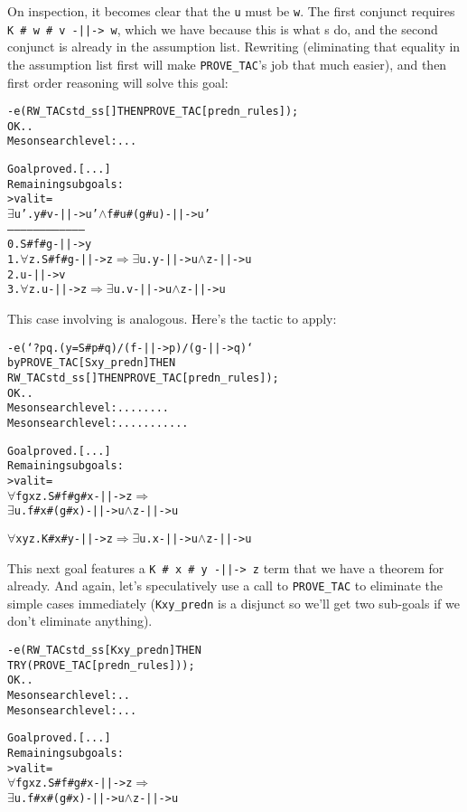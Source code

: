     On inspection, it becomes clear that the \texttt{u} must be
    \texttt{w}.  The first conjunct requires \verb!K # w # v -||-> w!,
    which we have because this is what \KC{}s do, and the second
    conjunct is already in the assumption list.  Rewriting
    (eliminating that equality in the assumption list first will make
    \texttt{PROVE\_TAC}'s job that much easier), and then first order
    reasoning will solve this goal:
\begin{session}
\begin{alltt}
- e (RW_TAC std_ss [] THEN PROVE_TAC [predn_rules]);
OK..
Meson search level: ...

Goal proved. [...]
Remaining subgoals:
> val it =
    \(\exists\)u'. y # v -||-> u' \(\land\) f # u # (g # u) -||-> u'
    ------------------------------------
      0.  S # f # g -||-> y
      1.  \(\forall\)z. S # f # g -||-> z \(\Rightarrow\) \(\exists\)u. y -||-> u \(\land\) z -||-> u
      2.  u -||-> v
      3.  \(\forall\)z. u -||-> z \(\Rightarrow\) \(\exists\)u. v -||-> u \(\land\) z -||-> u
\end{alltt}
\end{session}
This case involving \SC{} is analogous.  Here's the tactic to apply:
\begin{session}
\begin{alltt}
- e (`?p q. (y = S # p # q) /\bs (f -||-> p) /\bs (g -||-> q)`
        by PROVE_TAC [Sxy_predn] THEN
     RW_TAC std_ss [] THEN PROVE_TAC [predn_rules]);
OK..
Meson search level: ........
Meson search level: ...........

Goal proved.[...]
Remaining subgoals:
> val it =
    \(\forall\)f g x z. S # f # g # x -||-> z \(\Rightarrow\)
              \(\exists\)u. f # x # (g # x) -||-> u \(\land\) z -||-> u


    \(\forall\)x y z. K # x # y -||-> z \(\Rightarrow\) \(\exists\)u. x -||-> u \(\land\) z -||-> u
\end{alltt}
\end{session}
This next goal features a \verb!K # x # y -||-> z! term that we have a
theorem for already.  And again, let's speculatively use a call to
\texttt{PROVE\_TAC} to eliminate the simple cases immediately
(\verb!Kxy_predn! is a disjunct so we'll get two sub-goals if we don't
eliminate anything).
\begin{session}
\begin{alltt}
- e (RW_TAC std_ss [Kxy_predn] THEN
     TRY (PROVE_TAC [predn_rules]));
OK..
Meson search level: ..
Meson search level: ...

Goal proved. [...]
Remaining subgoals:
> val it =
    \(\forall\)f g x z. S # f # g # x -||-> z \(\Rightarrow\)
              \(\exists\)u. f # x # (g # x) -||-> u \(\land\) z -||-> u
\end{alltt}
\end{session}
